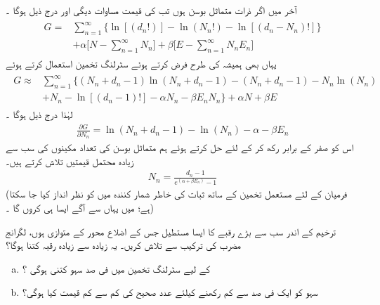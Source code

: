 آخر میں اگر ذرات  متماثل بوسن ہوں تب  کی قیمت مساوات  دیگی اور درج ذیل ہوگا ۔
\begin{gather}
\begin{aligned}
G =& \sum_{n = 1}^{\infty} \{ \ln[(d_n !) ] - \ln(N_n !) - \ln[(d_n - N_n) ! ] \} \\
&+ \alpha \big [ N - \sum_{n = 1}^{\infty} N_n \big ] + \beta \big [ E - \sum_{n = 1}^{\infty} N_n E_n \big ]
\end{aligned}
\end{gather}
یہاں بھی ہمیشہ کی طرح  فرض کرتے ہوئے سٹرلنگ تخمین استعمال کرتے ہوئے 
\begin{gather}
\begin{aligned}
G \approx &\sum_{n = 1}^{\infty} \{ (N_n + d_n - 1) \ln(N_n + d_n - 1) - (N_n + d_n - 1) - N_n \ln(N_n) \\
&+ N_n - \ln[(d_n - 1) !] - \alpha N_n - \beta E_n N_n \} + \alpha N + \beta E
\end{aligned}
\end{gather}
لہٰذا درج ذیل ہوگا ۔
\begin{align}
\frac{\partial G}{\partial N_n} = \ln(N_n + d_n - 1) - \ln(N_n) - \alpha - \beta E_n
\end{align}
اس کو صفر کے برابر رکھ کر  کے لئے حل کرتے ہوئے ہم متماثل بوسن کی تعداد مکینوں کی سب  سے زیادہ محتمل قیمتیں  تلاش کرتے ہیں۔ 
\begin{align}\label{مساوات_متماثل_سب_سے_زیادہ_محتمل_برائے_بوسن}
N_n = \frac{d_n - 1}{e^{(\alpha + \beta E_n)} - 1}
\end{align}
(فرمیان کے لئے  مستعمل  تخمین کے ساتھ ثبات کی خاطر  شمار کنندہ میں  کو نظر انداز کیا جا سکتا ہے؛  میں یہاں سے آگے ایسا ہی کروں گا ۔)

ترخیم  کے اندر  سب سے بڑے  رقبے کا ایسا مستطیل جس کے اضلاع محور کے متوازی ہوں،  لگرانج مضرب کی ترکیب سے تلاش کریں۔  یہ  زیادہ سے زیادہ رقبہ کتنا  ہوگا؟ 
\begin{enumerate}[a.]
\item
{} کے لیے سٹرلنگ تخمین میں فی صد  سہو  کتنی  ہوگی ؟
\item
سہو  کو ایک فی صد سے کم رکھنے کیلئے عدد صحیح  کی کم سے کم قیمت کیا ہوگی؟ 
\end{enumerate}



